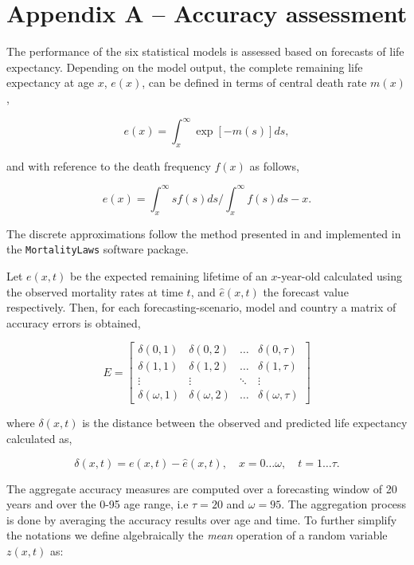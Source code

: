 \documentclass[T0_MEM]{subfiles}
\begin{document}
\section{Appendix A -- Accuracy assessment}
\label{sec:appendix_a}

The performance of the six statistical models is assessed based on forecasts of life expectancy. Depending on the model output, the complete remaining life expectancy at age $x$, $e(x)$, can be defined in terms of central death rate $m(x)$,

\begin{equation}
 e(x) = \int_{x}^{\infty} \exp[ -m(s)] ds,
\end{equation}

and with reference to the death frequency $f(x)$ as follows,

\begin{equation}
 e(x) = \int_{x}^{\infty} s f(s) ds \Big/ \int_{x}^{\infty} f(s) ds - x.
\end{equation}

The discrete approximations follow the method presented in \cite{preston2001} and implemented in the \texttt{MortalityLaws} software package.

Let $e(x,t)$ be the expected remaining lifetime of an $x$-year-old calculated using the observed mortality rates at time $t$, and $\hat{e}(x,t)$  the forecast value respectively. Then, for each forecasting-scenario,  model and country a matrix of accuracy errors is obtained,

\begin{equation}
 E = \begin{bmatrix}
    \delta(0,1) & \delta(0,2) & \dots  & \delta(0,\tau) \\
    \delta(1,1) & \delta(1,2) & \dots  & \delta(1,\tau) \\
    \vdots & \vdots & \ddots & \vdots \\
    \delta(\omega,1) & \delta(\omega,2) & \dots  & \delta(\omega,\tau)
\end{bmatrix}
\end{equation}

where $\delta(x,t)$ is the distance between the observed and predicted life expectancy calculated as,

\begin{equation}
\delta(x,t) = e(x,t) - \hat{e}(x,t), \quad x = 0 \dots \omega, \quad t = 1 \dots \tau.
\end{equation}

The aggregate accuracy measures are computed over a forecasting window of 20 years and over the 0-95 age range, i.e $\tau = 20$ and $\omega = 95$. The aggregation process is done by averaging the accuracy results over age and time. To further simplify the notations we define algebraically the \emph{mean} operation of a random variable $z(x,t)$ as:
\end{document}
